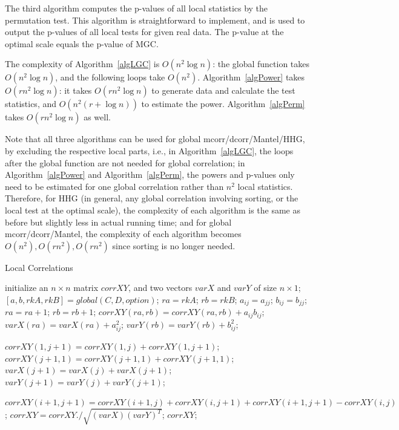 \documentclass[11pt]{article}
\begin{document}
The third algorithm computes the p-values of all local statistics by the permutation test. This algorithm is straightforward to implement, and is used to output the p-values of all local tests for given real data. The p-value at the optimal scale equals the p-value of MGC.

The complexity of Algorithm~\ref{algLGC} is $O(n^2 \log n)$: the global function takes $O(n^2 \log n)$, and the following loops take $O(n^2)$. Algorithm~\ref{algPower} takes $O(rn^2 \log n)$: it takes $O(rn^2 \log n)$ to generate data and calculate the test statistics, and $O(n^2 (r+\log n))$ to estimate the power. Algorithm~\ref{algPerm} takes $O(rn^2 \log n)$ as well. 

Note that all three algorithms can be used for global mcorr/dcorr/Mantel/HHG, by excluding the respective local parts, i.e., in Algorithm~\ref{algLGC}, the loops after the global function are not needed for global correlation; in Algorithm~\ref{algPower} and Algorithm~\ref{algPerm}, the powers and p-values only need to be estimated for one global correlation rather than $n^2$ local statistics. Therefore, for HHG (in general, any global correlation involving sorting, or the local test at the optimal scale), the complexity of each algorithm is the same as before but slightly less in actual running time; and for global mcorr/dcorr/Mantel, the complexity of each algorithm becomes $O(n^2), O(rn^2), O(rn^2)$ since sorting is no longer needed.

\begin{algorithm}
\caption{Local Correlations}
\label{algLGC}
\begin{algorithmic}
  
\State initialize an $n \times n$ matrix $corrXY$, and two vectors $varX$ and $varY$ of size $n \times 1$;
\State $[a,b,rkA,rkB]=global(C,D,option)$; 
\State $ra=rkA$; $rb=rkB$;
\State $a_{ij}=a_{jj}$; 
\EndIf
{}
\State $b_{ij}=b_{jj}$;
\EndIf
\State $ra=ra+1$; $rb=rb+1$;
\State $corrXY(ra, rb)=corrXY(ra, rb)+a_{ij}b_{ij}$;
\State $varX(ra)=varX(ra)+a_{ij}^2$;
\State $varY(rb)=varY(rb)+b_{ij}^2$;
\EndFor
\EndFor

\State $corrXY(1, j+1)=corrXY(1, j)+corrXY(1, j+1)$;
\State $corrXY(j+1,1)=corrXY(j+1,1)+corrXY(j+1,1)$;
\State $varX(j+1)=varX(j)+varX(j+1)$;
\State $varY(j+1)=varY(j)+varY(j+1)$;
\EndFor

\State $corrXY(i+1,j+1)=corrXY(i+1,j)+corrXY(i,j+1)+corrXY(i+1,j+1)-corrXY(i,j)$;
\EndFor
\EndFor
\State $corrXY=corrXY./\sqrt{(varX) (varY)^{T}}$; 
\State \Return $corrXY$;
\EndFunction
\end{algorithmic}
\end{algorithm}
\end{document}
